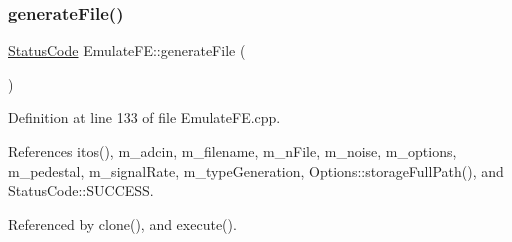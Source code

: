 \subsubsection{\texorpdfstring{generate\+File()}{generateFile()}}
{\footnotesize\ttfamily \hyperlink{classStatusCode}{Status\+Code} Emulate\+F\+E\+::generate\+File (\begin{DoxyParamCaption}{ }\end{DoxyParamCaption})\hspace{0.3cm}{\ttfamily [protected]}}



Definition at line 133 of file Emulate\+F\+E.\+cpp.



References itos(), m\+\_\+adcin, m\+\_\+filename, m\+\_\+n\+File, m\+\_\+noise, m\+\_\+options, m\+\_\+pedestal, m\+\_\+signal\+Rate, m\+\_\+type\+Generation, Options\+::storage\+Full\+Path(), and Status\+Code\+::\+S\+U\+C\+C\+E\+SS.



Referenced by clone(), and execute().


